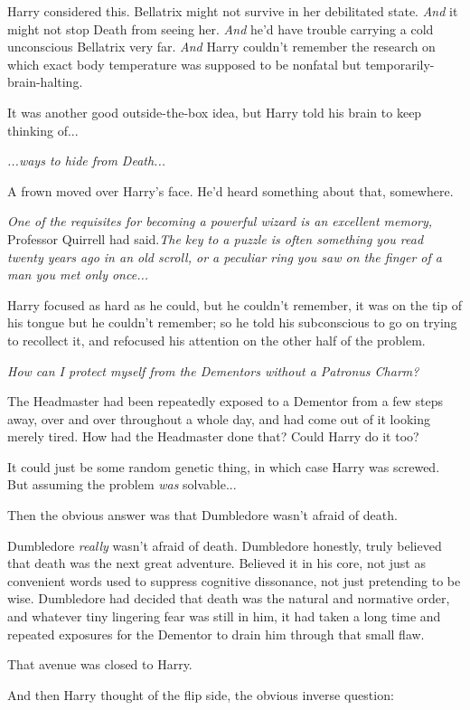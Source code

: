 Harry considered this. Bellatrix might not survive in her debilitated
state. \emph{And} it might not stop Death from seeing her. \emph{And}
he'd have trouble carrying a cold unconscious Bellatrix very far.
\emph{And} Harry couldn't remember the research on which exact body
temperature was supposed to be nonfatal but temporarily-brain-halting.

It was another good outside-the-box idea, but Harry told his brain to
keep thinking of...

\emph{...ways to hide from Death...}

A frown moved over Harry's face. He'd heard something about that,
somewhere.

\emph{One of the requisites for becoming a powerful wizard is an
excellent memory,} Professor Quirrell had said.\emph{The key to a puzzle
is often something you read twenty years ago in an old scroll, or a
peculiar ring you saw on the finger of a man you met only once...}

Harry focused as hard as he could, but he couldn't remember, it was on
the tip of his tongue but he couldn't remember; so he told his
subconscious to go on trying to recollect it, and refocused his
attention on the other half of the problem.

\emph{How can I protect myself from the Dementors without a Patronus
Charm?}

The Headmaster had been repeatedly exposed to a Dementor from a few
steps away, over and over throughout a whole day, and had come out of it
looking merely tired. How had the Headmaster done that? Could Harry do
it too?

It could just be some random genetic thing, in which case Harry was
screwed. But assuming the problem \emph{was} solvable...

Then the obvious answer was that Dumbledore wasn't afraid of death.

Dumbledore \emph{really} wasn't afraid of death. Dumbledore honestly,
truly believed that death was the next great adventure. Believed it in
his core, not just as convenient words used to suppress cognitive
dissonance, not just pretending to be wise. Dumbledore had decided that
death was the natural and normative order, and whatever tiny lingering
fear was still in him, it had taken a long time and repeated exposures
for the Dementor to drain him through that small flaw.

That avenue was closed to Harry.

And then Harry thought of the flip side, the obvious inverse question:

